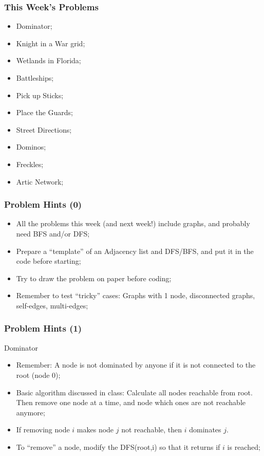 \begin{frame}
  \frametitle{This Week's Problems}
  \begin{itemize}
  \item Dominator;
  \item Knight in a War grid;
  \item Wetlands in Florida;
  \item Battleships;
  \item Pick up Sticks;
  \item Place the Guards;
  \item Street Directions;
  \item Dominos;
  \item Freckles;
  \item Artic Network;
  \end{itemize}
\end{frame}

\begin{frame}
  \frametitle{Problem Hints (0)}
  \begin{itemize}
  \item All the problems this week (and next week!) include graphs,
    and probably need BFS and/or DFS;

    \medskip

  \item Prepare a ``template'' of an Adjacency list and DFS/BFS, and
    put it in the code before starting;

    \medskip

  \item Try to draw the problem on paper before coding;

    \medskip

  \item Remember to test ``tricky'' cases: Graphs with 1 node,
    disconnected graphs, self-edges, multi-edges;
  \end{itemize}
\end{frame}

\begin{frame}
  \frametitle{Problem Hints (1)}
  {\smaller
  \begin{block}{Dominator}
    \begin{itemize}
    \item Remember: A node is not dominated by anyone if it is not connected to the root (node 0);
    \item Basic algorithm discussed in class: Calculate all nodes
      reachable from root. Then remove one node at a time, and node which ones are not reachable anymore;
    \item If removing node $i$ makes node $j$ not reachable, then $i$ dominates $j$.
    \item To ``remove'' a node, modify the DFS(root,i) so that it returns if $i$ is reached;
    \end{itemize}
  \end{block}
  }
\end{frame}

